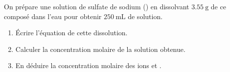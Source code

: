 On prépare une solution de sulfate de sodium () en dissolvant
$\qty{3.55}{\g}$ de ce composé dans l'eau pour obtenir $\qty{250}{\mL}$ de
solution.
\begin{enumerate}
    \item Écrire l'équation de cette dissolution.
    \item Calculer la concentration molaire de la solution obtenue.
    \item En déduire la concentration molaire des ions  et
          .
\end{enumerate}

